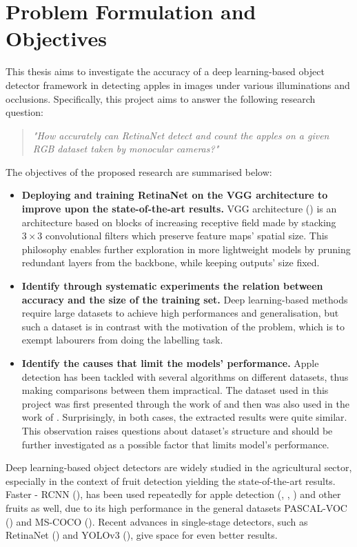 \section{Problem Formulation and Objectives}
This thesis aims to investigate the accuracy of a deep learning-based object detector framework in detecting apples in images under various illuminations and occlusions. Specifically, this project aims to answer the following research question:

\begin{quote}
\centering 
\textit{"How accurately can RetinaNet detect and count the apples on a given RGB dataset taken by monocular cameras?"}
\end{quote}

The objectives of the proposed research are summarised below:

\begin{itemize}
\item \textbf{Deploying and training RetinaNet on the VGG architecture to improve upon the state-of-the-art results.} VGG architecture (\cite{simonyan2014very}) is an architecture based on blocks of increasing receptive field made by stacking $3\times3$ convolutional filters which preserve feature maps' spatial size. This philosophy enables further exploration in more lightweight models by pruning redundant layers from the backbone, while keeping outputs' size fixed.  
\item \textbf{Identify through systematic experiments the relation between accuracy and the size of the training set.} Deep learning-based methods require large datasets to achieve high performances and generalisation, but such a dataset is in contrast with the motivation of the problem, which is to exempt labourers from doing the labelling task.
\item \textbf{Identify the causes that limit the models' performance.} Apple detection has been tackled with several algorithms on different datasets, thus making comparisons between them impractical. The dataset used in this project was first presented through the work of \cite{bargoti2017deep} and then was also used in the work of \cite{liang2018apple}. Surprisingly, in both cases, the extracted results were quite similar. This observation raises questions about dataset's structure and should be further investigated as a possible factor that limits model's performance.
\end{itemize}

Deep learning-based object detectors are widely studied in the agricultural sector, especially in the context of fruit detection yielding the state-of-the-art results. Faster - RCNN (\cite{ren2015faster}), has been used repeatedly for apple detection (\cite{sa2016deepfruits}, \cite{bargoti2017deep}, \cite{tao2018rapid}) and other fruits as well, due to its high performance in the general datasets PASCAL-VOC (\cite{everingham2010pascal}) and MS-COCO (\cite{lin2014microsoft}). Recent advances in single-stage detectors, such as RetinaNet (\cite{lin2017focal}) and YOLOv3 (\cite{redmon2018yolov3}), give space for even better results.

